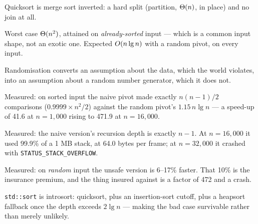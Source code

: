\begin{chaptersummary}
\begin{tight}
  \item Quicksort is merge sort inverted: a hard split (partition, $\Theta(n)$,
        in place) and no join at all.
  \item Worst case $\Theta(n^{2})$, attained on \emph{already-sorted} input ---
        which is a common input shape, not an exotic one. Expected
        $O(n\operatorname{lg} n)$ with a random pivot, on every input.
  \item Randomisation converts an assumption about the data, which the world
        violates, into an assumption about a random number generator, which it
        does not.
  \item Measured: on sorted input the naive pivot made exactly $n(n-1)/2$
        comparisons ($0.9999 \times n^{2}/2$) against the random pivot's
        $1.15\,n\lg n$ --- a speed-up of 41.6 at $n{=}1{,}000$ rising to 471.9
        at $n{=}16{,}000$.
  \item Measured: the naive version's recursion depth is exactly $n-1$. At
        $n = 16{,}000$ it used 99.9\% of a 1 MB stack, at 64.0 bytes per frame;
        at $n = 32{,}000$ it crashed with \texttt{STATUS\_STACK\_OVERFLOW}.
  \item Measured: on \emph{random} input the unsafe version is 6--17\% faster.
        That 10\% is the insurance premium, and the thing insured against is a
        factor of 472 and a crash.
  \item \texttt{std::sort} is introsort: quicksort, plus an insertion-sort
        cutoff, plus a heapsort fallback once the depth exceeds $2\lg n$ ---
        making the bad case survivable rather than merely unlikely.
\end{tight}
\end{chaptersummary}

